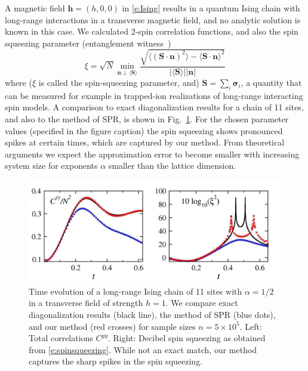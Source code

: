 \documentclass[aps,prl,showpacs,amsmath,amssymb,superscriptaddress,reprint,10pt]{revtex4-1}
\newcommand{\ar}[1]{{\color{analabha} #1}}
\newcommand{\mvec}[1]{\boldsymbol #1}
\begin{document}
A magnetic field $\mvec{h}=(h,0,0)$ in \eqref{e:Ising} results in a quantum Ising chain with long-range interactions in a transverse magnetic field, and no analytic solution is known in this case. We calculated 2-spin correlation functions, and also the \ar{spin squeezing parameter} {\ar{\tiny{(entanglement witness~\cite{ssq0,ssq1})}}}
\begin{equation}\label{e:spinsqueezing}
\xi = \sqrt{N}\min_{\mvec{n}\perp\langle\mvec{S}\rangle}\frac{\sqrt{\langle(\mvec{S}\cdot\mvec{n})^2\rangle - \langle\mvec{S}\cdot\mvec{n}\rangle^2}}{|\langle\mvec{S}\rangle||\mvec{n}|}
\end{equation}
where {\ar{\tiny{($\xi$ is called the spin-squeezing parameter, and)}}} $\mvec{S}=\sum_i \mvec{\sigma}_i$, a quantity that can be measured for example in trapped-ion realizations of long-range interacting spin models. A comparison to exact diagonalization results for a chain of 11 sites, and also to the method of SPR, is shown in Fig.~\ref{f:TFIM}. For the chosen parameter values (specified in the figure caption) the spin squeezing shows pronounced spikes at certain times, which are captured by our method. From theoretical arguments we expect the approximation error to become smaller with increasing system size for exponents $\alpha$ smaller than the lattice dimension. 

\begin{figure}\centering
\includegraphics[width=\linewidth]{./Jz1hx1_Schach_alph05_N11_nt500000.jpg}
\caption{\label{f:TFIM}%
Time evolution of a long-range Ising chain of 11 sites with $\alpha=1/2$ in a transverse field of strength $h=1$. We compare exact diagonalization results (black line), the method of SPR (blue dots), and our method (red crosses) for sample sizes $n=5\times10^5$. Left: Total correlations $C^{yy}$. Right: Decibel spin squeezing as obtained from \eqref{e:spinsqueezing}. While not an exact match, our method captures the sharp spikes in the spin squeezing.
}%
\end{figure}
\end{document}
